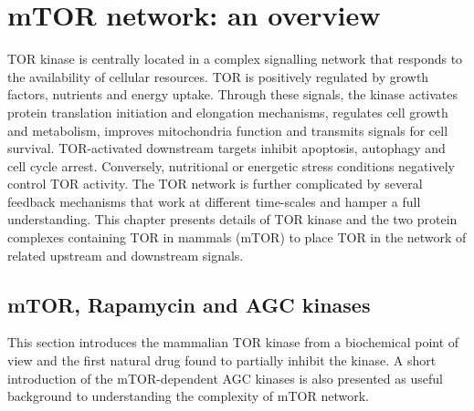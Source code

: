 \graphicspath{{Chapter3/Chapter3Figs/}}


\chapter{mTOR network: an overview}
\label{chap:mTOR network: an overview}
TOR kinase is centrally located in a complex signalling network that responds to the availability of cellular resources. TOR is positively regulated by growth factors, nutrients and energy uptake. Through these signals, the kinase activates protein translation initiation and elongation mechanisms, regulates cell growth and metabolism, improves mitochondria function and transmits signals for cell survival. TOR-activated downstream targets inhibit apoptosis, autophagy and cell cycle arrest. Conversely, nutritional or energetic stress conditions negatively control TOR activity. The TOR network is further complicated by several feedback mechanisms that work at different time-scales and hamper a full understanding. This chapter presents details of TOR kinase and the two protein complexes containing TOR in mammals (mTOR) to place TOR in the network of related upstream and downstream signals.

\section{mTOR, Rapamycin and AGC kinases}
\label{sec:mTOR, Rapamycin and AGC kinases}
This section introduces the mammalian TOR kinase from a biochemical point of view and the first natural drug found to partially inhibit the kinase. A short introduction of the mTOR-dependent AGC kinases is also presented as useful background to understanding the complexity of mTOR network.


